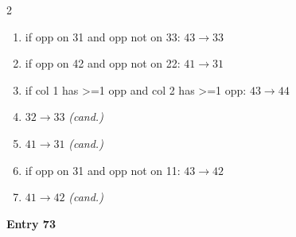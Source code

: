 \begin{multicols}{2}
\begin{enumerate}[topsep=1pt,itemsep=0pt,parsep=0pt,leftmargin=2.2em,label=\arabic*.]
\item if opp on 31 and opp not on 33: $43\!\to\!33$
\item if opp on 42 and opp not on 22: $41\!\to\!31$
\item if col 1 has >=1 opp and col 2 has >=1 opp: $43\!\to\!44$
\item $32\!\to\!33$ \hfill\textit{(cand.)}
\item $41\!\to\!31$ \hfill\textit{(cand.)}
\item if opp on 31 and opp not on 11: $43\!\to\!42$
\item $41\!\to\!42$ \hfill\textit{(cand.)}
\end{enumerate}\smallskip
\noindent\textbf{Entry 73} \; 
\end{multicols}
